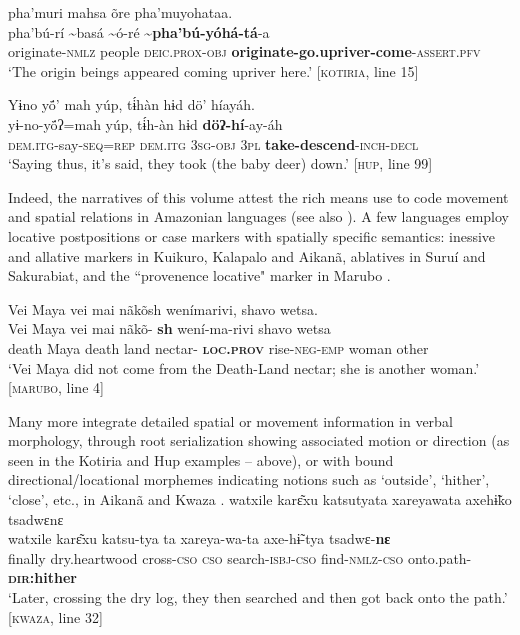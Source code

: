 \documentclass[output=paper,
modfonts,nonflat
]{langsci/langscibook}
\begin{document}
 
\ea\label{ex:intro:24} pha'muri mahsa õre pha'muyohataa.  \\[.3em]
\gll {\textasciitilde}pha'bú-rí	{\textasciitilde}basá 	{\textasciitilde}ó-ré	\textbf{{\textasciitilde}pha'bú-yóhá-tá}-a \\
     originate-\textsc{nmlz}	people  	\textsc{deic.prox-obj}  	\textbf{originate-go.upriver-come}-\textsc{assert.pfv} \\
\glt ‘The origin beings appeared coming upriver here.’ [\textsc{kotiria}, line 15]
\z

  
\ea\label{ex:intro:25}  Yɨno yö́’ mah yúp, tɨ́hàn hɨd dö’ híayáh.\\[.3em]
\gll yɨ-no-yö́ʔ=mah yúp, tɨ́h-àn hɨd \textbf{döʔ-hí}-ay-áh\\
     \textsc{dem.itg-}say\textsc{-seq=rep} \textsc{dem.itg} \textsc{3sg-obj} \textsc{3pl} \textbf{take-descend}\textsc{-inch-decl}\\
\glt ‘Saying thus, it’s said, they took (the baby deer) down.' [\textsc{hup}, line 99]
\z

Indeed, the narratives of this volume attest the rich means use to code movement and spatial relations in Amazonian languages (see also \citealt{Bozzi2013}). A few languages employ locative postpositions or case markers with spatially specific semantics: inessive and allative markers in Kuikuro, Kalapalo and Aikanã, ablatives in Suruí and Sakurabiat, and the “provenence locative" marker in Marubo . 

\ea\label{ex:intro:26} Vei Maya vei mai nãkõsh wenímarivi, shavo wetsa. \\[.3em]
\gll Vei   Maya vei   mai nãkõ- \textbf{sh}                  wení-ma-rivi          shavo wetsa \\
     death Maya death land nectar- \textbf{\textsc{loc.prov}} rise-\textsc{neg-emp} woman other \\
\glt `Vei Maya did not come from the Death-Land nectar; she is another woman.' [\textsc{marubo}, line 4]
\z

Many more integrate detailed spatial or movement information in verbal morphology, through root serialization showing associated motion or direction (as seen in the Kotiria and Hup examples -- above), or with bound directional/locational morphemes indicating notions such as ‘outside’, ‘hither’, ‘close’, etc., in Aikanã and Kwaza . 
\ea\label{ex:intro:27} watxile karɛ͂xu katsutyata xareyawata axehɨ̃ko tsadwɛnɛ\\[.3em]
\gll watxile	karɛ͂xu				katsu-tya	ta		xareya-wa-ta		axe-hɨ̃-tya	tsadwɛ-\textbf{nɛ}\\
finally		dry.heartwood	cross-\textsc{cso}	\textsc{cso}	search-\textsc{isbj-cso}		find-\textsc{nmlz-cso}	onto.path-\textbf{\textsc{dir}:hither}\\
\glt ‘Later, crossing the dry log, they then searched and then got back onto the path.’ [\textsc{kwaza}, line 32]
\z
\end{document}
